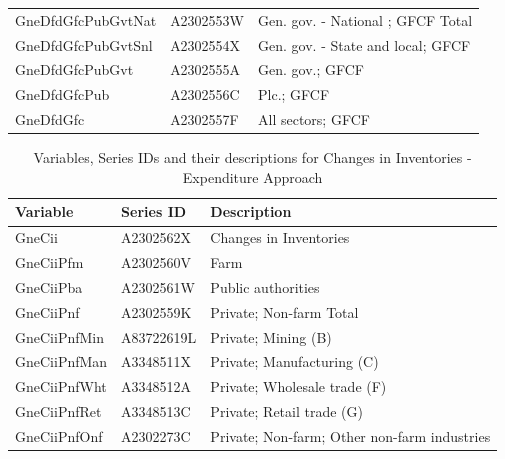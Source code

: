 \documentclass[graybox]{svmult}
\begin{document}
\begin{table}
\begin{tabular*}{\columnwidth}[width = \textwidth]{lll}
		\addlinespace
    GneDfdGfcPubGvtNat    & A2302553W & Gen. gov. - National ; GFCF Total\\
    GneDfdGfcPubGvtSnl    & A2302554X & Gen. gov. - State and local; GFCF\\
    GneDfdGfcPubGvt       & A2302555A & Gen. gov.; GFCF\\
    GneDfdGfcPub          & A2302556C & Plc.; GFCF\\
    GneDfdGfc             & A2302557F & All sectors; GFCF\\
		\bottomrule
	\end{tabular*}
	\label{Tab:Expenditure-hierarchy-1}
\end{table}

\begin{table}[h]
	\caption{Variables, Series IDs and their descriptions for Changes in Inventories - Expenditure Approach}
	\small
	\centering
	\begin{tabular*}{\columnwidth}[width = \textwidth]{lll}
		\toprule
		\textbf{Variable} & \textbf{Series ID} & \textbf{Description}\\
		\midrule
    GneCii       & A2302562X  & Changes in Inventories\\
    GneCiiPfm    & A2302560V  & Farm\\
    GneCiiPba    & A2302561W  & Public authorities\\
    GneCiiPnf    & A2302559K  & Private; Non-farm Total\\
    GneCiiPnfMin & A83722619L & Private; Mining (B)\\
		\addlinespace
    GneCiiPnfMan & A3348511X  & Private; Manufacturing (C)\\
    GneCiiPnfWht & A3348512A  & Private; Wholesale trade (F)\\
    GneCiiPnfRet & A3348513C  & Private; Retail trade (G)\\
    GneCiiPnfOnf & A2302273C  & Private; Non-farm; Other non-farm industries\\
		\bottomrule
	\end{tabular*}
	\label{Tab:Expenditure-hierarchy-2}
\end{table}
\end{document}
